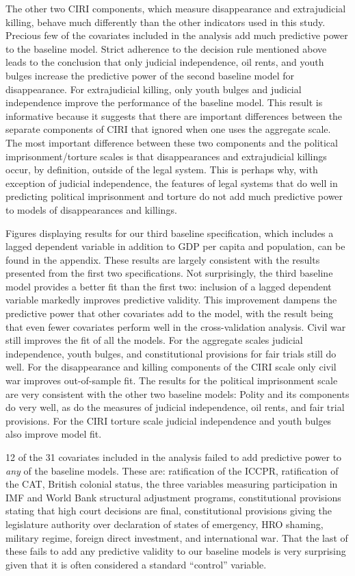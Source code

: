 \documentclass[12pt]{article}
\begin{document}
The other two CIRI components, which measure disappearance and extrajudicial killing, behave much differently than the other indicators used in this study. Precious few of the covariates included in the analysis add much predictive power to the baseline model. Strict adherence to the decision rule mentioned above leads to the conclusion that only judicial independence, oil rents, and youth bulges increase the predictive power of the second baseline model for disappearance. For extrajudicial killing, only youth bulges and judicial independence improve the performance of the baseline model. This result is informative because it suggests that there are important differences between the separate components of CIRI that ignored when one uses the aggregate scale. The most important difference between these two components and the political imprisonment/torture scales is that disappearances and extrajudicial killings occur, by definition, outside of the legal system. This is perhaps why, with exception of judicial independence, the features of legal systems that do well in predicting political imprisonment and torture do not add much predictive power to models of disappearances and killings. 

Figures displaying results for our third baseline specification, which includes a lagged dependent variable in addition to GDP per capita and population, can be found in the appendix. These results are largely consistent with the results presented from the first two specifications. Not surprisingly, the third baseline model provides a better fit than the first two: inclusion of a lagged dependent variable markedly improves predictive validity. This improvement dampens the predictive power that other covariates add to the model, with the result being that even fewer covariates perform well in the cross-validation analysis. Civil war still improves the fit of all the models. For the aggregate scales judicial independence, youth bulges, and constitutional provisions for fair trials still do well. For the disappearance and killing components of the CIRI scale only civil war improves out-of-sample fit. The results for the political imprisonment scale are very consistent with the other two baseline models: Polity and its components do very well, as do the measures of judicial independence, oil rents, and fair trial provisions. For the CIRI torture scale judicial independence and youth bulges also improve model fit. 

12 of the 31 covariates included in the analysis failed to add predictive power to {\it any} of the baseline models. These are: ratification of the ICCPR, ratification of the CAT, British colonial status, the three variables measuring participation in IMF and World Bank structural adjustment programs, constitutional provisions stating that high court decisions are final, constitutional provisions giving the legislature authority over declaration of states of emergency, HRO shaming, military regime, foreign direct investment, and international war. That the last of these fails to add any predictive validity to our baseline models is very surprising given that it is often considered a standard ``control'' variable. 
\end{document}
